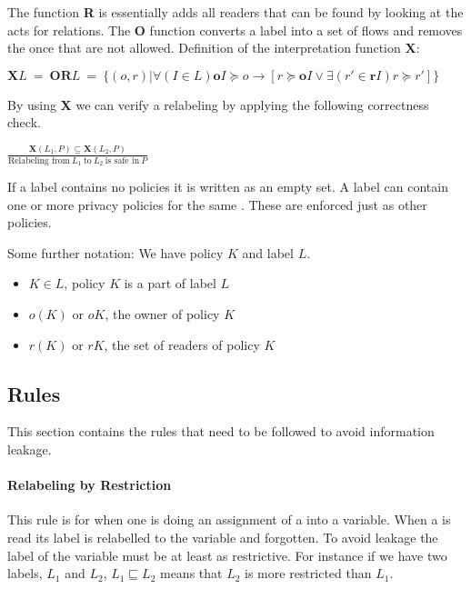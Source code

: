 The function \textbf{R} is essentially adds all readers that can be found by looking at the acts for relations.
The \textbf{O} function converts a label into a set of flows and removes the once that are not allowed.
Definition of the interpretation function $\textbf{X}$:
\begin{center}
  $\textbf{X}L \ = \ \textbf{OR}L \ = \ \{(o,r)|\forall (I \in L) \textbf{o}I \succeq o \rightarrow [r \succeq \textbf{o}I \vee \exists (r' \in \textbf{r}I) r \succeq r'] \}$
\end{center}

By using \textbf{X} we can verify a relabeling by applying the following correctness check.
\begin{center}
  $\frac{\textbf{X}(L_1, P)\subseteq \textbf{X}(L_2,P)}{\mbox{Relabeling from} \ L_1 \ \mbox{to} \ L_2 \ \mbox{is safe in} \ P }$
\end{center}

If a label contains no policies it is written as an empty set.
A label can contain one or more privacy policies for the same \principal{}.
These are enforced just as other policies.

Some further notation:
We have policy $K$ and label $L$.
\begin{itemize}
\item $K \in L$, policy $K$ is a part of label $L$
\item $o(K)$ or $oK$, the owner of policy $K$
\item $r(K)$ or $rK$, the set of readers of policy $K$
\end{itemize}

\subsection{Rules}
This section contains the rules that need to be followed to avoid information leakage.

\paragraph{Relabeling by Restriction}
This rule is for when one is doing an assignment of a \xvalue{} into a variable.
When a \xvalue{} is read its label is relabelled to the variable and forgotten.
To avoid leakage the label of the variable must be at least as restrictive.
For instance if we have two labels, $L_1$ and $L_2$, $L_1 \sqsubseteq L_2$ means that $L_2$ is more restricted than $L_1$.

